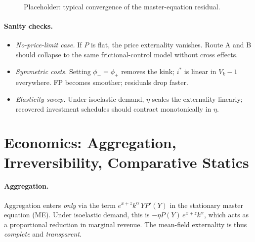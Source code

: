 \documentclass[11pt,letterpaper,oneside]{article}
\numberwithin{equation}{section}
\newcommand{\1}{\mathbf{1}}
\begin{document}
\begin{figure}[ht]
\centering
{}
\caption{Placeholder: typical convergence of the master-equation residual.}
\end{figure}

\paragraph{Sanity checks.}
\begin{itemize}[leftmargin=1.25em]
\item \emph{No-price-limit case.} If $P$ is flat, the price externality vanishes. Route A and B should collapse to the same frictional-control model without cross effects.
\item \emph{Symmetric costs.} Setting $\phi_-=\phi_+$ removes the kink; $i^*$ is linear in $V_k-1$ everywhere. FP becomes smoother; residuals drop faster.
\item \emph{Elasticity sweep.} Under isoelastic demand, $\eta$ scales the externality linearly; recovered investment schedules should contract monotonically in $\eta$.
\end{itemize}

\section{Economics: Aggregation, Irreversibility, Comparative Statics}

\paragraph{Aggregation.}
Aggregation enters \emph{only} via the term $e^{x+z}k^\alpha\,Y P'(Y)$ in the stationary master equation (ME). Under isoelastic demand, this is $-\eta P(Y)\,e^{x+z}k^\alpha$, which acts as a proportional reduction in marginal revenue. The mean-field externality is thus \emph{complete} and \emph{transparent}.
\end{document}
